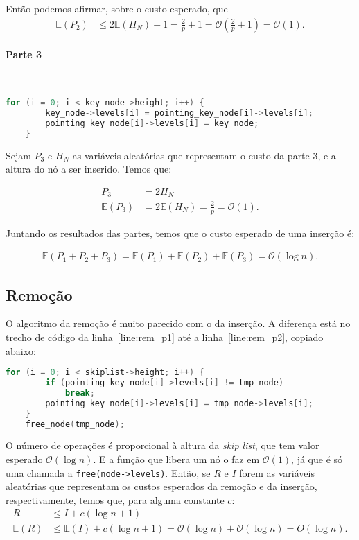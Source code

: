 \documentclass[paper=a4, fontsize=11pt]{scrartcl} %
\numberwithin{equation}{section}
\numberwithin{figure}{section}
\numberwithin{table}{section}
\numberwithin{definition}{section}
\numberwithin{theorem}{section}
\numberwithin{property}{section}
\numberwithin{proposition}{section}
\newcommand{\cO}{\ensuremath{\mathcal{O}}}
\renewcommand{\sl}{\textit{skip list}\xspace}
\newcommand{\Exp}{\ensuremath{{\mathbb{E}}}\xspace}
\begin{document}
Então podemos afirmar, sobre o custo esperado, que
\begin{align*}
\Exp(P_2) &\leq 2\Exp(H_N) + 1 = \frac{2}{p} + 1  = \cO \left( \frac{2}{p} + 1 \right) = \cO(1).
\end{align*}


\paragraph{Parte 3}
\ \\

\begin{lstlisting}[caption=Inserção Parte 3., language=C]
    for (i = 0; i < key_node->height; i++) {                     
        key_node->levels[i] = pointing_key_node[i]->levels[i];
        pointing_key_node[i]->levels[i] = key_node;
    }                                                           
\end{lstlisting}

Sejam $P_3$ e $H_N$ as variáveis aleatórias que representam o custo da parte 3, e a altura do nó a ser
inserido. Temos que:

\begin{align*}
P_3 &= 2 H_N \\
\Exp(P_3) &= 2 \Exp(H_N) = \frac{2}{p} = \cO(1).
\end{align*}


Juntando os resultados das partes, temos que o custo esperado de uma inserção é:

\begin{align*}
\Exp(P_1 + P_2 + P_3) = \Exp(P_1) + \Exp(P_2) + \Exp(P_3) = \cO(\log n).
\end{align*}


\subsection{Remoção}

O algoritmo da remoção é muito parecido com o da inserção. A diferença está no trecho de código da linha~\ref{line:rem_p1}
até a linha~\ref{line:rem_p2}, copiado abaixo:
\begin{lstlisting}[caption=Parte exclusiva da Remoção, language=C]
    for (i = 0; i < skiplist->height; i++) {
        if (pointing_key_node[i]->levels[i] != tmp_node)
            break;
        pointing_key_node[i]->levels[i] = tmp_node->levels[i];
    }
    free_node(tmp_node);
\end{lstlisting}

O número de operações é proporcional à altura da \sl, que tem valor esperado $\cO(\log n)$. E a função 
que libera um nó o faz em $\cO(1)$, já que é só uma chamada a \verb|free(node->levels)|. Então, se $R$ e $I$ forem
as variáveis aleatórias que representam os custos esperados da remoção e da inserção, respectivamente, temos que,
para alguma constante $c$:
\begin{align*}
R &\leq I + c( \log n + 1) \\
\Exp(R) &\leq \Exp(I) + c( \log n + 1) = \cO(\log n) + \cO(\log n) = O(\log n).
\end{align*}
\end{document}
